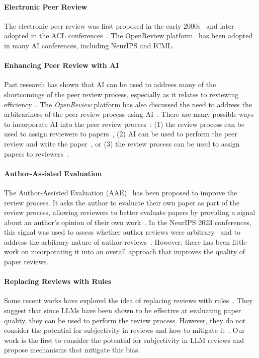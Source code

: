 \documentclass{article} %
\begin{document}
\paragraph{Electronic Peer Review}
The electronic peer review was first proposed in the early 2000s~\citep{bornmann2007we,facey2017educational,gibson2015digital,warne2016rewarding} and later adopted in the ACL conferences~\citep{nicholson2016brief,tran2020open}. The OpenReview platform~\citep{tran2020open} has been adopted in many AI conferences, including NeurIPS and ICML. 
\paragraph{Enhancing Peer Review with AI} 
Past research has shown that AI can be used to address many of the shortcomings of the peer review process, especially as it relates to reviewing efficiency~\citep{rogers2020can, liu2023reviewergpt}. The \textit{OpenReview} platform has also discussed the need to address the arbitrariness of the peer review process using AI~\citep{tran2020open}. There are many possible ways to incorporate AI into the peer review process~\citep{checco2021ai, kuznetsov2024can}: (1) the review process can be used to assign reviewers to papers~\citep{zhang2022system,mimno2007expertise}, (2) AI can be used to perform the peer review and write the paper~\citep{lu2024ai}, or (3) the review process can be used to assign papers to reviewers~\citep{stelmakh2021novice}. 
\paragraph{Author-Assisted Evaluation}
The Author-Assisted Evaluation (AAE)~\citep{su2021you,wu2023isotonic} has been proposed to
improve the review process. It asks the author to evaluate their own paper as part of the review process, allowing reviewers to better evaluate papers by providing a signal about an author’s opinion of their own work~\citep{centeno2015inaccuracy}. In the NeurIPS 2023 conferences, this signal was used to assess whether author reviews were arbitrary~\citep{beygelzimer2023has} and to address the arbitrary nature of author reviews~\citep{cortes2021inconsistency}. However, there has been little work on incorporating it into an overall approach that improves the quality of paper reviews. 

\paragraph{Replacing Reviews with Rules} 
Some recent works have explored the idea of replacing reviews with rules~\citep{liu2023reviewergpt, xuneurips}. They suggest that since LLMs have been shown to be effective at evaluating paper quality, they can be used to perform the review process. However, they do not consider the potential for subjectivity in reviews and how to mitigate it~\citep{liu2023reviewergpt, xuneurips}. Our work is the first to consider the potential for subjectivity in LLM reviews and propose mechanisms that mitigate this bias.
\end{document}
